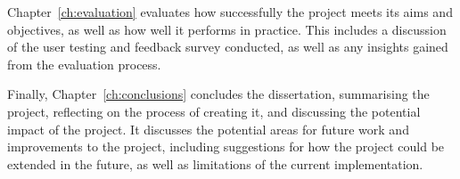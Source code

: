 \documentclass[../main.tex]{subfiles}
\begin{document}
        Chapter~\ref{ch:evaluation} evaluates how successfully the project meets its
            aims and objectives, as well as how well it performs in practice.
        This includes a discussion of the user testing and feedback survey conducted,
            as well as any insights gained from the evaluation process.

        Finally, Chapter~\ref{ch:conclusions} concludes the dissertation, summarising
            the project, reflecting on the process of creating it, and discussing the
            potential impact of the project.
        It discusses the potential areas for future work and improvements to the
            project, including suggestions for how the project could be extended in the
            future, as well as limitations of the current implementation.
\end{document}
